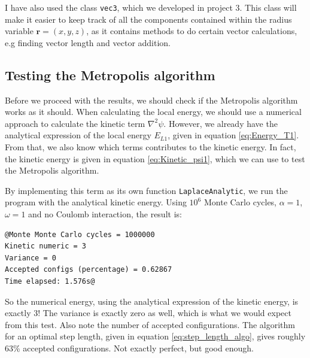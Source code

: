 \documentclass[12pt]{article}
\begin{document}
I have also used the class \texttt{vec3}, which we developed in project 3. This class will make it easier to keep track of all the components contained within the radius variable $\mathbf{r} = (x, y, z)$, as it contains methods to do certain vector calculations, e.g finding vector length and vector addition. 


\subsection{Testing the Metropolis algorithm}
Before we proceed with the results, we should check if the Metropolis algorithm works as it should. When calculating the local energy, we should use a numerical approach to calculate the kinetic term $\nabla^2\psi$. However, we already have the analytical expression of the local energy $E_{L1}$, given in equation \ref{eq:Energy_T1}. From that, we also know which terms contributes to the kinetic energy. In fact, the kinetic energy is given in equation \ref{eq:Kinetic_psi1}, which we can use to test the Metropolis algorithm.

By implementing this term as its own function \texttt{LaplaceAnalytic}, we run the program with the analytical kinetic energy. Using $10^6$ Monte Carlo cycles, $\alpha = 1$, $\omega = 1$ and no Coulomb interaction, the result is:
\begin{lstlisting}
@Monte Monte Carlo cycles = 1000000
Kinetic numeric = 3
Variance = 0
Accepted configs (percentage) = 0.62867
Time elapsed: 1.576s@
\end{lstlisting}
So the numerical energy, using the analytical expression of the kinetic energy, is exactly 3! The variance is exactly zero as well, which is what we would expect from this test. Also note the number of accepted configurations. The algorithm for an optimal step length, given in equation \ref{eq:step_length_algo}, gives roughly 63\% accepted configurations. Not exactly perfect, but good enough.
\end{document}
